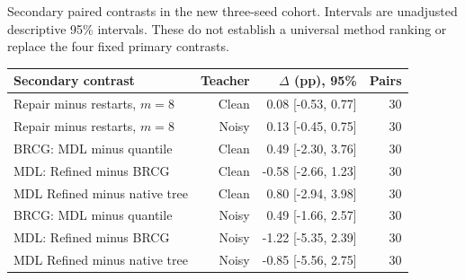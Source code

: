 \begin{kbtable}
\centering
\caption{Secondary paired contrasts in the new three-seed cohort. Intervals are unadjusted descriptive 95\% intervals. These do not establish a universal method ranking or replace the four fixed primary contrasts.}
\label{tab:checklist_secondary}
\small
\begin{adjustbox}{max width=\linewidth}
\begin{tabular}{lrrr}
\toprule
Secondary contrast & Teacher & $\Delta$ (pp), 95\% & Pairs \\
\midrule
Repair minus restarts, $m=8$ & Clean & 0.08 [-0.53, 0.77] & 30 \\
Repair minus restarts, $m=8$ & Noisy & 0.13 [-0.45, 0.75] & 30 \\
BRCG: MDL minus quantile & Clean & 0.49 [-2.30, 3.76] & 30 \\
MDL: Refined minus BRCG & Clean & -0.58 [-2.66, 1.23] & 30 \\
MDL Refined minus native tree & Clean & 0.80 [-2.94, 3.98] & 30 \\
BRCG: MDL minus quantile & Noisy & 0.49 [-1.66, 2.57] & 30 \\
MDL: Refined minus BRCG & Noisy & -1.22 [-5.35, 2.39] & 30 \\
MDL Refined minus native tree & Noisy & -0.85 [-5.56, 2.75] & 30 \\
\bottomrule
\end{tabular}
\end{adjustbox}
\end{kbtable}
